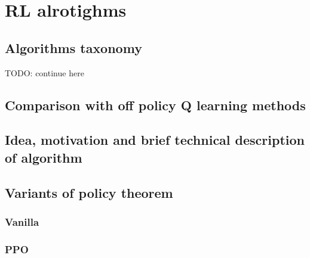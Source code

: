 \chapter{RL alrotighms}
\section{Algorithms taxonomy}
TODO: continue here
\section{Comparison with off policy Q learning methods}

\section{Idea, motivation and brief technical description of algorithm}

\section{Variants of policy theorem}
\subsection*{Vanilla}
\subsection*{PPO}

